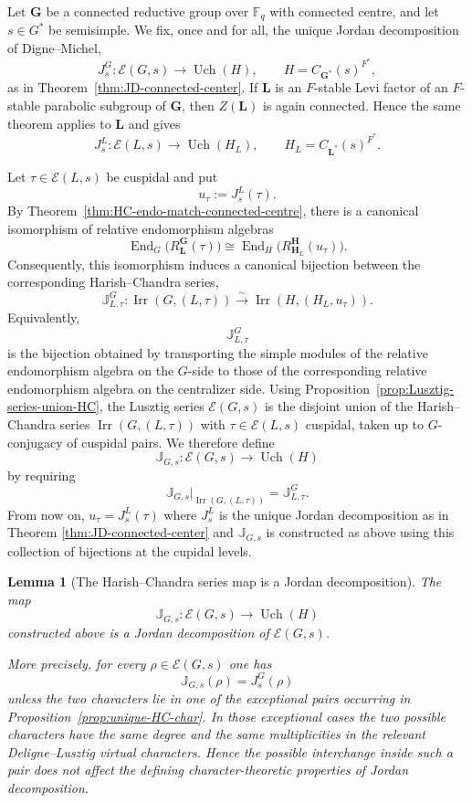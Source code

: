 \documentclass{amsart}
\theoremstyle{plain}
\numberwithin{equation}{section}
\newtheorem{lemma}[theorem]{Lemma}
\theoremstyle{definition}
\newcommand{\cE}{\mathcal{E}}
\newcommand{\End}{\operatorname{End}}
\newcommand{\Irr}{\operatorname{Irr}}
\newcommand{\fq}{\mathbb{F}_{q}}
\newcommand{\Uch}{\operatorname{Uch}}
\newcommand{\J}{\mathbb{J}}
\newcommand{\bG}{\mathbf{G}}
\newcommand{\bL}{\mathbf{L}}
\newcommand{\bH}{\mathbf{H}}
\begin{document}
Let $\bG$ be a connected reductive group over $\fq$ with connected centre, and
let $s\in G^*$ be semisimple.  We fix, once and for all, the unique
Jordan decomposition of Digne--Michel,
\[
J_s^G:\cE(G,s)\longrightarrow \Uch(H),
\qquad
H=C_{\bG^*}(s)^{F^*},
\]
as in Theorem~\ref{thm:JD-connected-center}.  If $\bL$ is an
$F$-stable Levi factor of an $F$-stable parabolic subgroup of $\bG$, then
$Z(\bL)$ is again connected.  Hence the same theorem applies to $\bL$ and gives
\[
J_s^L:\cE(L,s)\longrightarrow \Uch(H_L),
\qquad
H_L=C_{\bL^*}(s)^{F^*}.
\]

Let $\tau\in \cE(L,s)$ be cuspidal and put
\[
u_\tau:=J_s^L(\tau).
\]
By Theorem~\ref{thm:HC-endo-match-connected-centre}, there is a canonical
isomorphism of relative endomorphism algebras
\[
\End_G\!\bigl(R_{\bL}^{\bG}(\tau)\bigr)
\cong
\End_H\!\bigl(R_{\bH_L}^{\bH}(u_\tau)\bigr).
\]
Consequently, this isomorphism induces a canonical bijection between the
corresponding Harish--Chandra series,
\[
\J_{L,\tau}^{G}:
\Irr(G,(L,\tau))
\xrightarrow{\sim}
\Irr(H,(H_L,u_\tau)).
\]
Equivalently,
\[
\J_{L,\tau}^{G}
\]
is the bijection obtained by transporting the simple modules of the relative
endomorphism algebra on the $G$-side to those of the corresponding relative
endomorphism algebra on the centralizer side.
Using Proposition~\ref{prop:Lusztig-series-union-HC}, the Lusztig series
$\cE(G,s)$ is the disjoint union of the Harish--Chandra series
$\Irr(G,(L,\tau))$ with $\tau\in \cE(L,s)$ cuspidal, taken up to
$G$-conjugacy of cuspidal pairs.  We therefore define
\[
\J_{G,s}:\cE(G,s)\longrightarrow \Uch(H)
\]
by requiring
\[
\J_{G,s}|_{\Irr(G,(L,\tau))}=\J_{L,\tau}^{G}.
\]
From now on, $u_{\tau}=J_s^L(\tau)$ where $J_s^L$ is the unique Jordan decomposition as in Theorem \ref{thm:JD-connected-center} and $\J_{G,s}$ is constructed as above using this collection of bijections at the cupidal levels.
\smallskip
\begin{lemma}[The Harish--Chandra series map is a Jordan decomposition]
\label{lem:HC-series-map-is-JD}
The map
\[
\J_{G,s}:\cE(G,s)\longrightarrow \Uch(H)
\]
constructed above is a Jordan decomposition of $\cE(G,s)$.

More precisely, for every $\rho\in\cE(G,s)$ one has
\[
\J_{G,s}(\rho)=J_s^G(\rho)
\]
unless the two characters lie in one of the exceptional pairs occurring in
Proposition~\ref{prop:unique-HC-char}.  In those exceptional cases the two
possible characters have the same degree and the same multiplicities in the
relevant Deligne--Lusztig virtual characters.  Hence the possible interchange
inside such a pair does not affect the defining character-theoretic properties
of Jordan decomposition.
\end{lemma}
\end{document}
